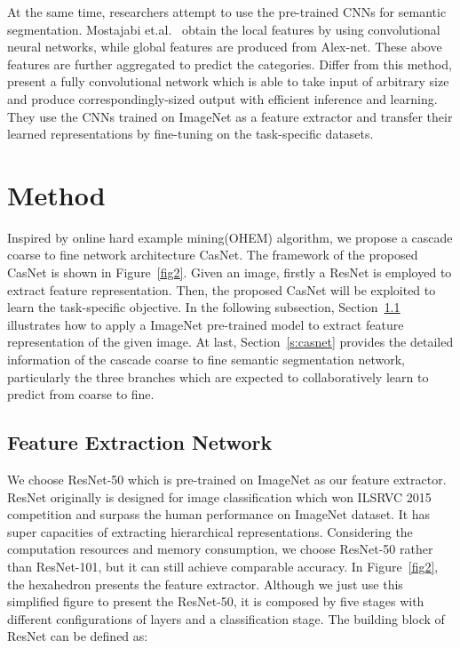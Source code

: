 \documentclass[10.5pt,compsoc]{TsT}
\newcommand{\upcite}[1]{\superscript{\textsuperscript{\cite{#1}}}}
\theoremstyle{mystyle}
\newcommand{\upcite}[1]{\textsuperscript{\cite{#1}}}
\begin{document}
{At the same time, researchers attempt to use the pre-trained CNNs for semantic segmentation. Mostajabi et.al.~\upcite{17} obtain the local features by using convolutional neural networks, while  global features are produced from Alex-net. These above features are further aggregated to predict the categories. Differ from this method, \cite{19} present a fully convolutional network which is able to take input of arbitrary size and produce correspondingly-sized output with efficient inference and learning. They use the CNNs trained on ImageNet as a feature extractor and transfer their learned representations by fine-tuning on the task-specific datasets.

\section{Method}
\label{s:Method}
\noindent


Inspired by online hard example mining(OHEM) algorithm, we propose a cascade coarse to fine network architecture CasNet. The framework of the proposed CasNet is shown in Figure~\ref{fig2}. Given an image, firstly a ResNet is employed to extract feature representation. Then, the proposed CasNet will be exploited to learn the task-specific objective. In the following subsection, Section~\ref{s:feature} illustrates how to apply a ImageNet pre-trained model to extract feature representation of the given image. At last, Section~\ref{s:casnet} provides the detailed information of the cascade coarse to fine semantic segmentation network, particularly the three branches which are expected to collaboratively learn to predict from coarse to fine.


\subsection{Feature Extraction Network}
\label{s:feature}
\noindent

We choose ResNet-50 which is pre-trained on ImageNet as our feature extractor. ResNet originally is designed for image classification which won ILSRVC 2015 competition and surpass the human performance on ImageNet dataset. It has super capacities of extracting hierarchical representations. Considering the computation resources and memory consumption, we choose ResNet-50 rather than ResNet-101, but it can still achieve comparable accuracy. In Figure~\ref{fig2}, the hexahedron presents the feature extractor. Although we just use this simplified figure to present the ResNet-50, it is composed by five stages with different configurations of layers and a classification stage. The building block of ResNet can be defined as:

}
\end{document}
